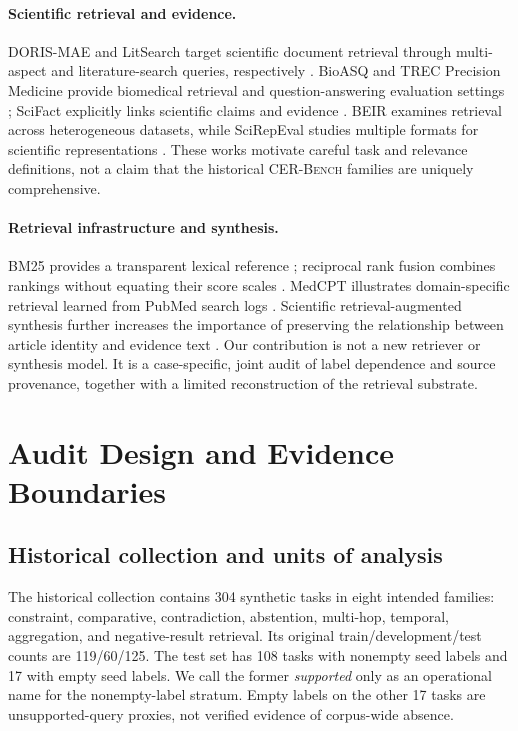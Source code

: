\documentclass{article}
\newcommand{\cer}{\textsc{CER-Bench}\xspace}
\begin{document}
\paragraph{Scientific retrieval and evidence.}
DORIS-MAE and LitSearch target scientific document retrieval through multi-aspect and literature-search queries, respectively \citep{dorismae2023,litsearch2024}. BioASQ and TREC Precision Medicine provide biomedical retrieval and question-answering evaluation settings \citep{bioasq2015,trecpm2017}; SciFact explicitly links scientific claims and evidence \citep{scifact2020}. BEIR examines retrieval across heterogeneous datasets, while SciRepEval studies multiple formats for scientific representations \citep{beir2021,specter2}. These works motivate careful task and relevance definitions, not a claim that the historical \cer families are uniquely comprehensive.

\paragraph{Retrieval infrastructure and synthesis.}
BM25 provides a transparent lexical reference \citep{robertson2009}; reciprocal rank fusion combines rankings without equating their score scales \citep{rrf2009}. MedCPT illustrates domain-specific retrieval learned from PubMed search logs \citep{medcpt2023}. Scientific retrieval-augmented synthesis further increases the importance of preserving the relationship between article identity and evidence text \citep{openscholar2026}. Our contribution is not a new retriever or synthesis model. It is a case-specific, joint audit of label dependence and source provenance, together with a limited reconstruction of the retrieval substrate.

\section{Audit Design and Evidence Boundaries}
\label{sec:design}
\subsection{Historical collection and units of analysis}
The historical collection contains 304 synthetic tasks in eight intended families: constraint, comparative, contradiction, abstention, multi-hop, temporal, aggregation, and negative-result retrieval. Its original train/development/test counts are 119/60/125. The test set has 108 tasks with nonempty seed labels and 17 with empty seed labels. We call the former \emph{supported} only as an operational name for the nonempty-label stratum. Empty labels on the other 17 tasks are unsupported-query proxies, not verified evidence of corpus-wide absence.
\end{document}
